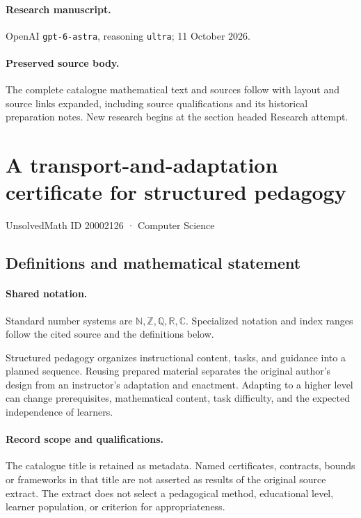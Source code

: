 \documentclass[11pt]{article}
\begin{document}
\paragraph{Research manuscript.} OpenAI \texttt{gpt-6-astra}, reasoning \texttt{ultra}; 11 October 2026.
\paragraph{Preserved source body.} The complete catalogue mathematical text and sources follow with layout and source links expanded, including source qualifications and its historical preparation notes. New research begins at the section headed Research attempt.

\section{A transport-and-adaptation certificate for structured pedagogy}\label{20002126}
{\small UnsolvedMath ID 20002126 · Computer Science}
\subsection{Definitions and mathematical statement}

\paragraph{Shared notation.}Standard number systems are $\mathbb N,\mathbb Z,\mathbb Q,\mathbb R,\mathbb C$. Specialized notation and index ranges follow the cited source and the definitions below.


Structured pedagogy organizes instructional content, tasks, and guidance into a planned sequence. Reusing prepared material separates the original author's design from an instructor's adaptation and enactment. Adapting to a higher level can change prerequisites, mathematical content, task difficulty, and the expected independence of learners.
\paragraph{Record scope and qualifications.}
The catalogue title is retained as metadata. Named certificates, contracts, bounds or frameworks in that title are not asserted as results of the original source extract.
The extract does not select a pedagogical method, educational level, learner population, or criterion for appropriateness.
\end{document}
